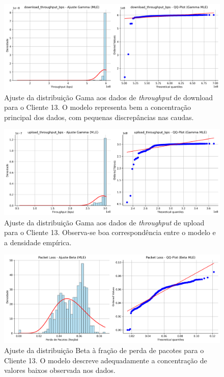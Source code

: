 \documentclass{article}
\begin{document}
\begin{figure}[htp]
	\includegraphics[width=\textwidth]{../figures/mle/download_throughput_bps_ajuste_gamma_client13.png}
	\caption{Ajuste da distribuição Gama aos dados de \textit{throughput} de download para o Cliente 13. O modelo representa bem a concentração principal dos dados, com pequenas discrepâncias nas caudas.}
	\label{fig:download_throughput_bps_ajuste_gamma_client13}
\end{figure}

\begin{figure}[htp]
	\includegraphics[width=\textwidth]{../figures/mle/upload_throughput_bps_ajuste_gamma_client13.png}
	\caption{Ajuste da distribuição Gama aos dados de \textit{throughput} de upload para o Cliente 13. Observa-se boa correspondência entre o modelo e a densidade empírica.}
	\label{fig:upload_throughput_bps_ajuste_gamma_client13}
\end{figure}

\begin{figure}[htp]
	\includegraphics[width=\textwidth]{../figures/mle/packet_loss_ajuste_beta_client13.png}
	\caption{Ajuste da distribuição Beta à fração de perda de pacotes para o Cliente 13. O modelo descreve adequadamente a concentração de valores baixos observada nos dados.}
	\label{fig:packet_loss_ajuste_beta_client13}
\end{figure}
\end{document}
